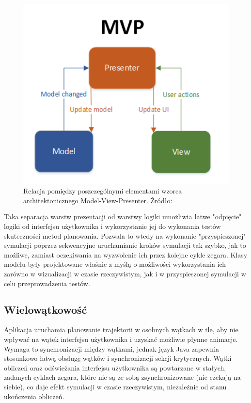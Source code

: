 \begin{figure}
	\centering
	\includegraphics[width=0.6\columnwidth]{img/app/mvp}
	\caption{Relacja pomiędzy poszczególnymi elementami wzorca architektonicznego Model-View-Presenter. Źródło: \cite{mvp}}
	\label{fig:app-mvp}
\end{figure}

Taka separacja warstw prezentacji od warstwy logiki umożliwia łatwe "odpięcie" logiki od interfejsu użytkownika i wykorzystanie jej do wykonania testów skuteczności metod planowania. Pozwala to wtedy na wykonanie "przyspieszonej" symulacji poprzez sekwencyjne uruchamianie kroków symulacji tak szybko, jak to możliwe, zamiast oczekiwania na wyzwolenie ich przez kolejne cykle zegara.
Klasy modelu były projektowane właśnie z myślą o możliwości wykorzystania ich zarówno w wizualizacji w czasie rzeczywistym, jak i w przyspieszonej symulacji w celu przeprowadzenia testów.

\subsection{Wielowątkowość}
Aplikacja uruchamia planowanie trajektorii w osobnych wątkach w tle, aby nie wpływać na wątek interfejsu użytkownika i uzyskać możliwie płynne animacje. Wymaga to synchronizacji między wątkami, jednak język Java zapewnia stosunkowo łatwą obsługę wątków i synchronizacji sekcji krytycznych. Wątki obliczeń oraz odświeżania interfejsu użytkownika są powtarzane w stałych, zadanych cyklach zegara, które nie są ze sobą zsynchronizowane (nie czekają na siebie), co daje efekt symulacji w czasie rzeczywistym, niezależnie od stanu ukończenia obliczeń.


